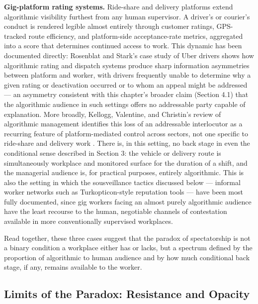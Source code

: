 \documentclass[10pt]{article}
\begin{document}
\textbf{Gig-platform rating systems.} Ride-share and delivery platforms extend algorithmic visibility furthest from any human supervisor. A driver's or courier's conduct is rendered legible almost entirely through customer ratings, GPS-tracked route efficiency, and platform-side acceptance-rate metrics, aggregated into a score that determines continued access to work. This dynamic has been documented directly: Rosenblat and Stark's case study of Uber drivers shows how algorithmic rating and dispatch systems produce sharp information asymmetries between platform and worker, with drivers frequently unable to determine why a given rating or deactivation occurred or to whom an appeal might be addressed \cite{rosenblat2016} --- an asymmetry consistent with this chapter's broader claim (Section 4.1) that the algorithmic audience in such settings offers no addressable party capable of explanation. More broadly, Kellogg, Valentine, and Christin's review of algorithmic management identifies this loss of an addressable interlocutor as a recurring feature of platform-mediated control across sectors, not one specific to ride-share and delivery work \cite{kellogg2020}. There is, in this setting, no back stage in even the conditional sense described in Section 3: the vehicle or delivery route is simultaneously workplace and monitored surface for the duration of a shift, and the managerial audience is, for practical purposes, entirely algorithmic. This is also the setting in which the sousveillance tactics discussed below --- informal worker networks such as Turkopticon-style reputation tools --- have been most fully documented, since gig workers facing an almost purely algorithmic audience have the least recourse to the human, negotiable channels of contestation available in more conventionally supervised workplaces.

Read together, these three cases suggest that the paradox of spectatorship is not a binary condition a workplace either has or lacks, but a spectrum defined by the proportion of algorithmic to human audience and by how much conditional back stage, if any, remains available to the worker.

\subsection{Limits of the Paradox: Resistance and Opacity}
\end{document}
